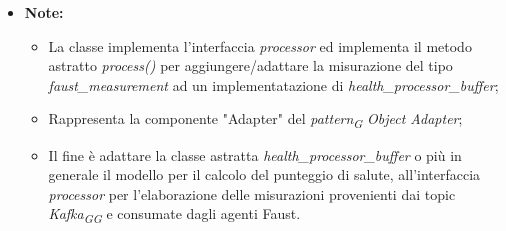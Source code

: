 \begin{itemize}
\begin{itemize}
\begin{itemize}
    \end{itemize}
    \item\textbf{Note:}
        \begin{itemize}
            \item La classe implementa l'interfaccia \textit{processor} ed implementa il metodo astratto \textit{process()} per aggiungere/adattare la misurazione del tipo \textit{faust\_measurement} ad un implementatazione di \textit{health\_processor\_buffer};
            \item Rappresenta la componente "Adapter" del \textit{pattern}\textsubscript{\textit{G}} \textit{Object Adapter};
            \item Il fine è adattare la classe astratta \textit{health\_processor\_buffer} o più in generale il modello per il calcolo del punteggio di salute, all'interfaccia \textit{processor} per l'elaborazione delle misurazioni provenienti dai topic \textit{Kafka}\textsubscript{\textit{G}}\textsubscript{\textit{G}} e consumate dagli agenti Faust.
        \end{itemize}
    \end{itemize}
\end{itemize}